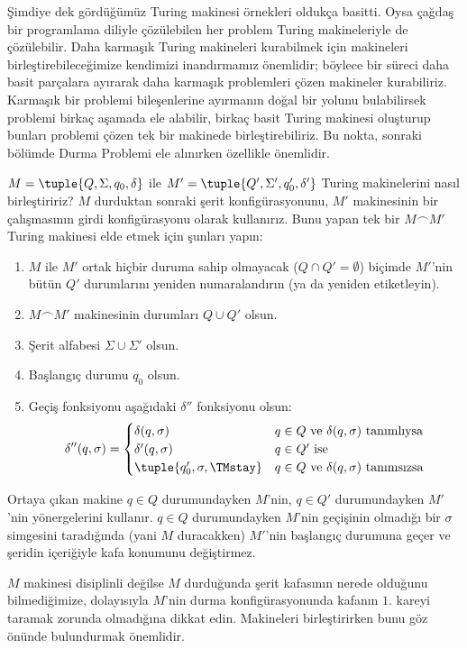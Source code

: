 \documentclass[../../../include/open-logic-section]{subfiles}
\begin{document}

\begin{explain}
Şimdiye dek gördüğümüz Turing makinesi örnekleri oldukça basitti. Oysa çağdaş
bir programlama diliyle çözülebilen her problem Turing makineleriyle de
çözülebilir. Daha karmaşık Turing makineleri kurabilmek için makineleri
birleştirebileceğimize kendimizi inandırmamız önemlidir; böylece bir süreci
daha basit parçalara ayırarak daha karmaşık problemleri çözen makineler
kurabiliriz. Karmaşık bir problemi bileşenlerine ayırmanın doğal bir yolunu
bulabilirsek problemi birkaç aşamada ele alabilir, birkaç basit Turing
makinesi oluşturup bunları problemi çözen tek bir makinede birleştirebiliriz.
Bu nokta, sonraki bölümde Durma Problemi ele alınırken özellikle önemlidir.

$M=\tuple{Q,\Sigma,q_0,\delta}$ ile
$M'=\tuple{Q',\Sigma',q_0',\delta'}$ Turing makinelerini nasıl birleştiririz?
$M$ durduktan sonraki şerit konfigürasyonunu, $M'$ makinesinin bir
çalışmasının girdi konfigürasyonu olarak kullanırız. Bunu yapan tek bir
$M\frown M'$ Turing makinesi elde etmek için şunları yapın:
\begin{enumerate}
    \item $M$ ile $M'$ ortak hiçbir duruma sahip olmayacak
    ($Q\cap Q'=\emptyset$) biçimde $M'$'nin bütün $Q'$ durumlarını yeniden
    numaralandırın (ya da yeniden etiketleyin).
    \item $M\frown M'$ makinesinin durumları $Q\cup Q'$ olsun.
    \item Şerit alfabesi $\Sigma\cup\Sigma'$ olsun.
    \item Başlangıç durumu $q_0$ olsun.
    \item Geçiş fonksiyonu aşağıdaki $\delta''$ fonksiyonu olsun:
    \[\delta''(q,\sigma) =
    \begin{cases}
      \delta(q,\sigma) & \text{$q \in Q$ ve $\delta(q,\sigma)$ tanımlıysa}\\
      \delta'(q,\sigma) & \text{$q \in Q'$ ise}\\
      \tuple{q_0', \sigma, \TMstay} & \text{$q \in Q$ ve
      $\delta(q,\sigma)$ tanımsızsa}
    \end{cases}\]
\end{enumerate}
Ortaya çıkan makine $q\in Q$ durumundayken $M$'nin, $q\in Q'$ durumundayken
$M'$'nin yönergelerini kullanır. $q\in Q$ durumundayken $M$'nin geçişinin
olmadığı bir $\sigma$ simgesini taradığında (yani $M$ duracakken) $M'$'nin
başlangıç durumuna geçer ve şeridin içeriğiyle kafa konumunu değiştirmez.

$M$ makinesi disiplinli değilse $M$ durduğunda şerit kafasının nerede
olduğunu bilmediğimize, dolayısıyla $M$'nin durma konfigürasyonunda kafanın
$1$. kareyi taramak zorunda olmadığına dikkat edin. Makineleri birleştirirken
bunu göz önünde bulundurmak önemlidir.
\end{explain}
\end{document}
